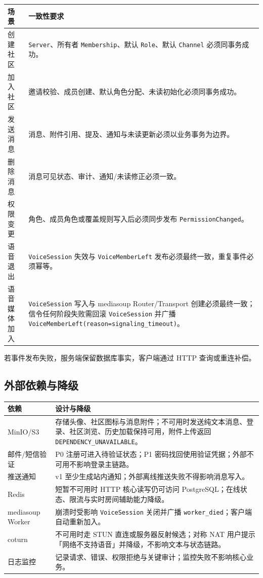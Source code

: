 \noindent\begin{tabularx}{\textwidth}{L{4cm}Y}
  \toprule
  场景 & 一致性要求 \\
  \midrule
  创建社区 & \texttt{Server}、所有者 \texttt{Membership}、默认 \texttt{Role}、默认 \texttt{Channel} 必须同事务成功。 \\
  加入社区 & 邀请校验、成员创建、默认角色分配、未读初始化必须同事务成功。 \\
  发送消息 & 消息、附件引用、提及、通知与未读更新必须以业务事务为边界。 \\
  删除消息 & 消息可见状态、审计、通知/未读修正必须一致。 \\
  权限变更 & 角色、成员角色或覆盖规则写入后必须同步发布 \texttt{PermissionChanged}。 \\
  语音退出 & \texttt{VoiceSession} 失效与 \texttt{VoiceMemberLeft} 发布必须最终一致，重复事件必须幂等。 \\
  语音媒体加入 & \texttt{VoiceSession} 写入与 mediasoup Router/Transport 创建必须最终一致；信令任何阶段失败需回滚 \texttt{VoiceSession} 并广播 \texttt{VoiceMemberLeft(reason=signaling\_timeout)}。 \\
  \bottomrule
\end{tabularx}

若事件发布失败，服务端保留数据库事实，客户端通过 HTTP 查询或重连补偿。

\subsection{外部依赖与降级}

\noindent\begin{tabularx}{\textwidth}{L{3.4cm}Y}
  \toprule
  依赖 & 设计与降级 \\
  \midrule
  MinIO/S3 & 存储头像、社区图标与消息附件；不可用时发送纯文本消息、登录、社区浏览、历史加载保持可用，附件上传返回 \texttt{DEPENDENCY\_UNAVAILABLE}。 \\
  邮件/短信验证 & P0 注册可进入待验证状态；P1 密码找回使用验证凭据；外部不可用不影响登录主链路。 \\
  推送通知 & v1 至少生成站内通知；外部离线推送失败不得影响消息写入。 \\
  Redis & 短暂不可用时 HTTP 核心读写仍可访问 PostgreSQL；在线状态、限流与实时房间辅助能力降级。 \\
  mediasoup Worker & 崩溃时受影响 \texttt{VoiceSession} 关闭并广播 \texttt{worker\_died}；客户端自动重新加入。 \\
  coturn & 不可用时走 STUN 直连或服务器反射候选；对称 NAT 用户提示「网络不支持语音」并降级，不影响文本与状态链路。 \\
  日志监控 & 记录请求、错误、权限拒绝与关键审计；监控失败不影响核心业务。 \\
  \bottomrule
\end{tabularx}

